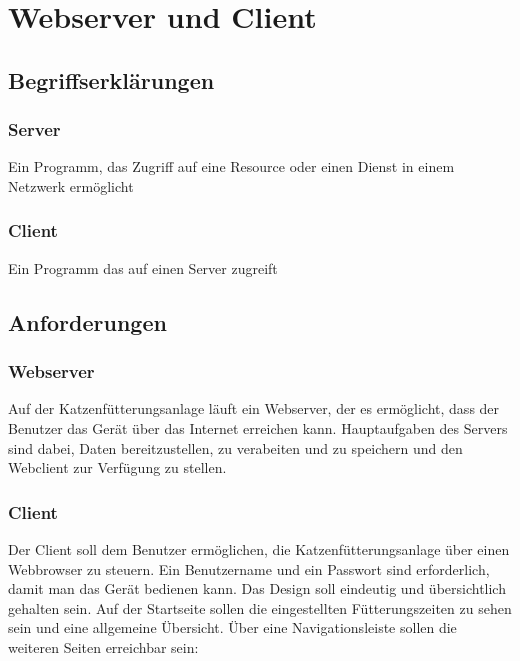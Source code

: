 \chapter{Webserver und Client}


\section{Begriffserklärungen}
\label{sec:begriffserklaerung}

\subsection{Server}
\label{sec:begrr-server}
Ein Programm, das Zugriff auf eine Resource oder einen Dienst in einem Netzwerk ermöglicht

\subsection{Client}
\label{sec:begrr-client}
Ein Programm das auf einen Server zugreift

\section{Anforderungen}
\label{sec:anforderungen}

\subsection{Webserver}
\label{sec:anf-server}
Auf der Katzenfütterungsanlage läuft ein Webserver, der es ermöglicht, dass der Benutzer das Gerät über das Internet erreichen kann. Hauptaufgaben des Servers sind dabei, Daten bereitzustellen, zu verabeiten und zu speichern und den Webclient zur Verfügung zu stellen.

\subsection{Client}
\label{sec:anf-client}
Der Client soll dem Benutzer ermöglichen, die Katzenfütterungsanlage über einen Webbrowser zu steuern. Ein Benutzername und ein Passwort sind erforderlich, damit man das Gerät bedienen kann. Das Design soll eindeutig und übersichtlich gehalten sein. Auf der Startseite sollen die eingestellten Fütterungszeiten zu sehen sein und eine allgemeine Übersicht. Über eine Navigationsleiste sollen die weiteren Seiten erreichbar sein:

